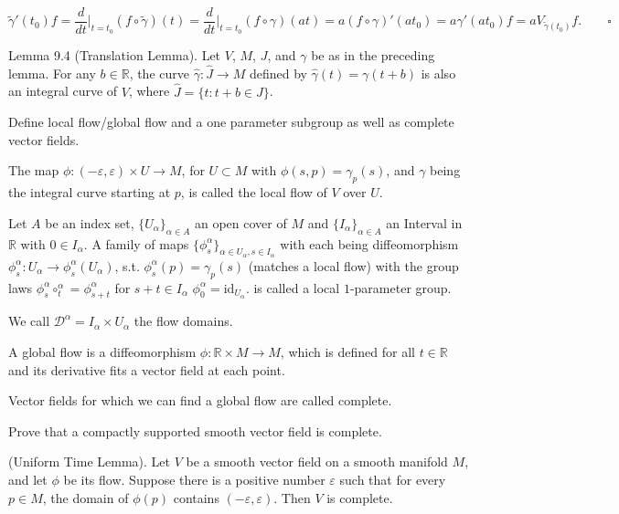 \[\tilde{\gamma}'(t_0)f 
= \frac{d}{dt}\bigg|_{t=t_0} (f \circ \tilde{\gamma})(t)
= \frac{d}{dt}\bigg|_{t=t_0} (f \circ \gamma)(at) 
= a (f \circ \gamma)' (at_0) 
= a \gamma' (at_0) f 
= a V_{\tilde{\gamma}(t_0)} f.
\qquad \square
\]

Lemma 9.4 (Translation Lemma). Let \(V\), \(M\), \(J\), and \(\gamma\) be as in the preceding lemma. 
For any \(b \in \mathbb{R}\), the curve \(\hat{\gamma}: \hat{J} \to M\) defined by \(\hat{\gamma}(t) = \gamma(t + b)\) is also an integral curve of \(V\), 
where \(\hat{J} = \{t: t + b \in J\}\).


Define local flow/global flow and a one parameter subgroup
as well as complete vector fields.

The map \( \phi : (-\varepsilon, \varepsilon) \times U \to M \), for \( U \subset M \) with \( \phi(s,p) = \gamma_p(s) \),
and \( \gamma \) being the integral curve starting at \( p \), is called the local flow of \( V \) over \( U \).

Let \( A \) be an index set, \( \{U_{\alpha}\}_{\alpha \in A}\) an open cover of \( M \)
and \( \{I_{\alpha}\}_{\alpha \in A}\) an Interval in \( \mathbb{R} \) with \(0 \in I_{\alpha} \).
A family of maps \( \{\phi_{s}^\alpha\}_{\alpha \in U_{\alpha}, s \in I_{\alpha}} \)
with each being diffeomorphism \( \phi^\alpha_s : U_\alpha \to \phi^\alpha_{s}(U_{\alpha})\),
s.t. 
\( \phi^\alpha_s(p) = \gamma_p(s) \) (matches a local flow) 
with the group laws 
\( \phi^\alpha_s \circ ^\alpha_t = \phi^\alpha_{s + t}\) for \( s + t \in I_{\alpha} \)
\( \phi^\alpha_0 = \text{id}_{U_\alpha} \).
is called a local \( 1 \)-parameter group.

We call \( \mathcal{D}^\alpha = I_\alpha \times U_\alpha \) the flow domains.

A global flow is a diffeomorphism \( \phi : \mathbb{R} \times M \to M \), which is defined
for all \( t \in \mathbb{R} \) and its derivative fits a vector field at each point.

Vector fields for which we can find a global flow are called complete.



Prove that a compactly supported smooth vector field is complete.

(Uniform Time Lemma). 
Let \(V\) be a smooth vector field on a smooth manifold \(M\), and let \(\phi\) be its flow. 
Suppose there is a positive number \(\varepsilon\) such that for every \(p \in M\), 
the domain of \(\phi(p)\) contains \((-\varepsilon, \varepsilon)\). Then \(V\) is complete.

